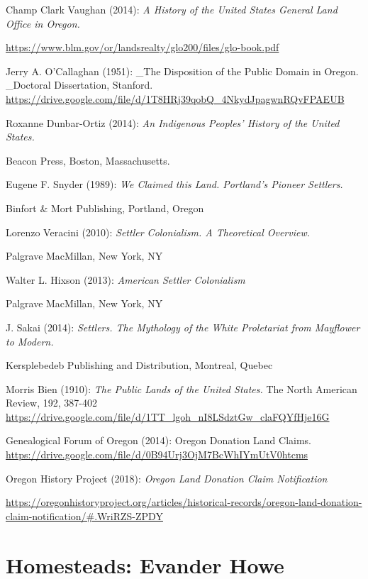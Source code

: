 \documentclass[
  12pt,
]{book}
\begin{document}
Champ Clark Vaughan (2014): \emph{A History of the United States General Land Office in Oregon.}

\url{https://www.blm.gov/or/landsrealty/glo200/files/glo-book.pdf}

Jerry A. O'Callaghan (1951): \_The Disposition of the Public Domain in Oregon. \_Doctoral Dissertation, Stanford. \url{https://drive.google.com/file/d/1T8HRj39qobQ_4NkydJpagwnRQvFPAEUB}

Roxanne Dunbar-Ortiz (2014): \emph{An Indigenous Peoples' History of the United States.}

Beacon Press, Boston, Massachusetts.

Eugene F. Snyder (1989): \emph{We Claimed this Land. Portland's Pioneer Settlers.}

Binfort \& Mort Publishing, Portland, Oregon

Lorenzo Veracini (2010): \emph{Settler Colonialism. A Theoretical Overview.}

Palgrave MacMillan, New York, NY

Walter L. Hixson (2013): \emph{American Settler Colonialism}

Palgrave MacMillan, New York, NY

J. Sakai (2014): \emph{Settlers. The Mythology of the White Proletariat from Mayflower to Modern.}

Kersplebedeb Publishing and Distribution, Montreal, Quebec

Morris Bien (1910): \emph{The Public Lands of the United States.} The North American Review, 192, 387-402 \href{https://drive.google.com/file/d/1TT_lgoh_nI8LSdztGw_claFQYfHje16G/view}{https://drive.google.com/file/d/1TT\_lgoh\_nI8LSdztGw\_claFQYfHje16G}

Genealogical Forum of Oregon (2014): Oregon Donation Land Claims. \url{https://drive.google.com/file/d/0B94Urj3OjM7BcWhIYmUtV0htcms}

Oregon History Project (2018): \emph{Oregon Land Donation Claim Notification}

\url{https://oregonhistoryproject.org/articles/historical-records/oregon-land-donation-claim-notification/\#.WriRZS-ZPDY}

\hypertarget{homesteads-evander-howe}{%
\section{Homesteads: Evander Howe}\label{homesteads-evander-howe}}
\end{document}
